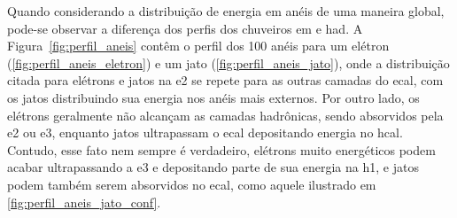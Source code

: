 Quando considerando a distribuição de energia em anéis de uma maneira global,
pode-se observar a diferença dos perfis dos chuveiros \gls{em} e
\gls{had}. A Figura~\ref{fig:perfil_aneis} contêm o perfil dos 100 anéis para um
elétron (\ref{fig:perfil_aneis_eletron}) e um jato
(\ref{fig:perfil_aneis_jato}), onde a distribuição citada para elétrons e jatos
na \gls{e2} se repete para as outras camadas do \gls{ecal}, com os jatos
distribuindo sua energia nos anéis mais externos. Por outro lado, os elétrons
geralmente não alcançam as camadas hadrônicas, sendo absorvidos pela
\gls{e2} ou \gls{e3}, enquanto jatos ultrapassam o \gls{ecal} depositando
energia no \gls{hcal}. Contudo, esse fato nem sempre é verdadeiro, elétrons
muito energéticos podem acabar ultrapassando a \gls{e3} e depositando parte de
sua energia na \gls{h1}, e jatos podem também serem absorvidos no \gls{ecal},
como aquele ilustrado em \ref{fig:perfil_aneis_jato_conf}.

